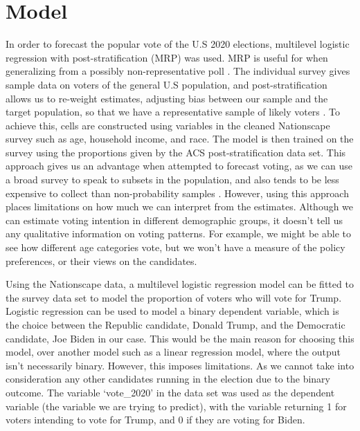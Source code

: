 \documentclass[
]{article}
\begin{document}
\hypertarget{model}{%
\section{Model}\label{model}}

In order to forecast the popular vote of the U.S 2020 elections, multilevel logistic regression with post-stratification (MRP) was used. MRP is useful for when generalizing from a possibly non-representative poll \cite{kennedy2020know}. The individual survey gives sample data on voters of the general U.S population, and post-stratification allows us to re-weight estimates, adjusting bias between our sample and the target population, so that we have a representative sample of likely voters \cite{alexander2020a}. To achieve this, cells are constructed using variables in the cleaned Nationscape survey such as age, household income, and race. The model is then trained on the survey using the proportions given by the ACS post-stratification data set. This approach gives us an advantage when attempted to forecast voting, as we can use a broad survey to speak to subsets in the population, and also tends to be less expensive to collect than non-probability samples \cite{alexander2020a}. However, using this approach places limitations on how much we can interpret from the estimates. Although we can estimate voting intention in different demographic groups, it doesn't tell us any qualitative information on voting patterns. For example, we might be able to see how different age categories vote, but we won't have a measure of the policy preferences, or their views on the candidates.

Using the Nationscape data, a multilevel logistic regression model can be fitted to the survey data set to model the proportion of voters who will vote for Trump. Logistic regression can be used to model a binary dependent variable, which is the choice between the Republic candidate, Donald Trump, and the Democratic candidate, Joe Biden in our case. This would be the main reason for choosing this model, over another model such as a linear regression model, where the output isn't necessarily binary. However, this imposes limitations. As we cannot take into consideration any other candidates running in the election due to the binary outcome. The variable `vote\_2020' in the data set was used as the dependent variable (the variable we are trying to predict), with the variable returning 1 for voters intending to vote for Trump, and 0 if they are voting for Biden.
\end{document}
